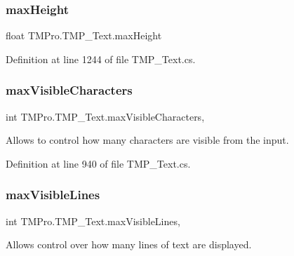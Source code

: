 \subsubsection{\texorpdfstring{maxHeight}{maxHeight}}
{\footnotesize\ttfamily float T\+M\+Pro.\+T\+M\+P\+\_\+\+Text.\+max\+Height\hspace{0.3cm}{\ttfamily [get]}}







Definition at line 1244 of file T\+M\+P\+\_\+\+Text.\+cs.

\mbox{\label{class_t_m_pro_1_1_t_m_p___text_a3acb105723b8b2f70a392135f26dfbaf}} 
\subsubsection{\texorpdfstring{maxVisibleCharacters}{maxVisibleCharacters}}
{\footnotesize\ttfamily int T\+M\+Pro.\+T\+M\+P\+\_\+\+Text.\+max\+Visible\+Characters\hspace{0.3cm}{\ttfamily [get]}, {\ttfamily [set]}}



Allows to control how many characters are visible from the input. 



Definition at line 940 of file T\+M\+P\+\_\+\+Text.\+cs.

\mbox{\label{class_t_m_pro_1_1_t_m_p___text_a91ad865ced62808c08d2e48330b68533}} 
\subsubsection{\texorpdfstring{maxVisibleLines}{maxVisibleLines}}
{\footnotesize\ttfamily int T\+M\+Pro.\+T\+M\+P\+\_\+\+Text.\+max\+Visible\+Lines\hspace{0.3cm}{\ttfamily [get]}, {\ttfamily [set]}}



Allows control over how many lines of text are displayed. 



